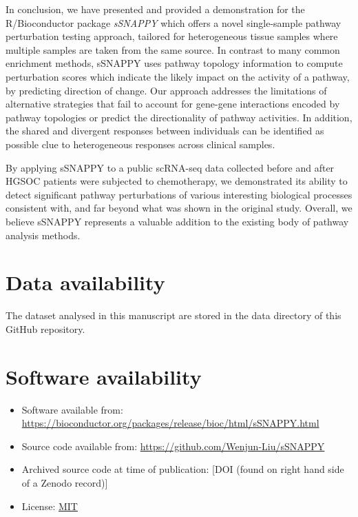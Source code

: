 \documentclass[9pt,a4paper,]{extarticle}
\begin{document}
In conclusion, we have presented and provided a demonstration for the R/Bioconductor package \emph{sSNAPPY} which offers a novel single-sample pathway perturbation testing approach, tailored for heterogeneous tissue samples where multiple samples are taken from the same source.
In contrast to many common enrichment methods, sSNAPPY uses pathway topology information to compute perturbation scores which indicate the likely impact on the activity of a pathway, by predicting direction of change.
Our approach addresses the limitations of alternative strategies that fail to account for gene-gene interactions encoded by pathway topologies or predict the directionality of pathway activities.
In addition, the shared and divergent responses between individuals can be identified as possible clue to heterogeneous responses across clinical samples.

By applying sSNAPPY to a public scRNA-seq data collected before and after HGSOC patients were subjected to chemotherapy, we demonstrated its ability to detect significant pathway perturbations of various interesting biological processes consistent with, and far beyond what was shown in the original study.
Overall, we believe sSNAPPY represents a valuable addition to the existing body of pathway analysis methods.

\hypertarget{data-availability}{%
\section{Data availability}\label{data-availability}}

The dataset analysed in this manuscript are stored in the data directory of this GitHub repository.

\hypertarget{software-availability}{%
\section{Software availability}\label{software-availability}}

\begin{itemize}
\item
  Software available from: \url{https://bioconductor.org/packages/release/bioc/html/sSNAPPY.html}
\item
  Source code available from: \url{https://github.com/Wenjun-Liu/sSNAPPY}
\item
  Archived source code at time of publication: {[}DOI (found on right hand side of a Zenodo record){]}
\item
  License: \href{https://opensource.org/license/mit/}{MIT}
\end{itemize}
\end{document}
